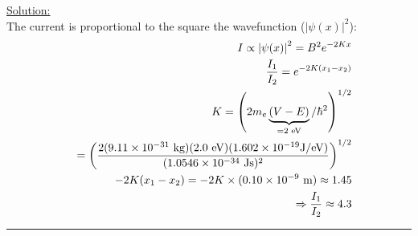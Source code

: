 \noindent
\underline{Solution:}\\

The current is proportional to the square the wavefunction ($\left|\psi(x)\right|^2$):
\begin{eqnarray}
\nonumber
& & I\propto \left|\psi(x)\right|^2 = B^2e^{-2Kx}\\
\nonumber
& & \frac{I_1}{I_2} = e^{-2K(x_1 - x_2)}\\
\nonumber
& & K=\left(2m_e\underbrace{(V - E)}_{=2\textnormal{ eV}}/\hbar^2\right)^{1/2}\\
\nonumber
& & = \left(\frac{2(9.11\times 10^{-31}\textnormal{ kg})(2.0\textnormal{ eV})(1.602\times 10^{-19}\textnormal{J/eV})}{(1.0546\times 10^{-34}\textnormal{ Js})^2}\right)^{1/2}\\
\nonumber
& & -2K(x_1 - x_2) = -2K\times(0.10\times 10^{-9}\textnormal{ m}) \approx 1.45\\
\nonumber
& & \Rightarrow \frac{I_1}{I_2} \approx 4.3
\end{eqnarray}

\hrule\vspace{0.5cm}
